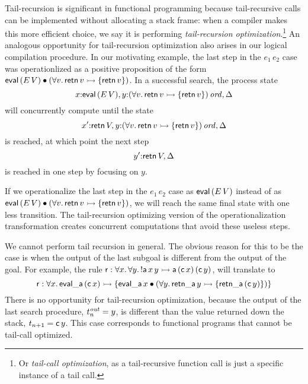 Tail-recursion is significant in functional programming because
tail-recursive calls can be implemented without allocating a stack
frame: when a compiler makes this more efficient choice, we say it is
performing {\it tail-recursion optimization}.\footnote{Or {\it tail-call optimization}, as a tail-recursive function call is just a
  specific instance of a tail call.} An analogous opportunity for
tail-recursion optimization also arises in our logical compilation
procedure. In our motivating example, the last step in the $e_1\,e_2$
case was operationlized as a positive proposition of the form ${\sf
  eval}\,(E\, V) \mathbin{\bullet} (\forall v.\,{\sf retn}\,v \rightarrowtail \{ {\sf
  retn}\,v \})$. In a successful search, the process state 
\[ x{:}{\sf
  eval}\,(E\, V), y{:}{(\forall v.\,{\sf retn}\,v \rightarrowtail \{
  {\sf retn}\,v \})}\,{{\it ord}}, \Delta\]
will concurrently compute until the
state 
\[ x'{:}{\sf retn}\,V, y{:}{(\forall v.\,{\sf retn}\,v \rightarrowtail
  \{ {\sf retn}\,v \})}\,{{\it ord}}, \Delta\] is reached, at which point the next
step \[y'{:}{\sf retn}\,V, \Delta\] is reached in one step by focusing
on $y$. 

If we operationalize the last step in the $e_1\,e_2$ case as ${\sf
  eval}\,(E\,V)$ instead of as ${\sf eval}\,(E\, V) \mathbin{\bullet} (\forall
v.\,{\sf retn}\,v \rightarrowtail \{ {\sf retn}\,v \})$, we will reach the same
final state with one less transition. The tail-recursion optimizing
version of the operationalization transformation creates concurrent
computations that avoid these useless steps.

We cannot perform tail recursion in general. The obvious reason for
this to be the case is when the output of the last subgoal is
different from the output of the goal. For example, the rule ${\sf r}
: \forall{x}.\,\forall{y}.\,{!}{\sf a}\,x\,y \rightarrowtail {\sf a}\,({\sf
  c}\,x)\,({\sf c}\,y)$, will translate to
\[ {\sf r} : \forall{x}.\,{\sf eval\_a}\,({\sf c}\,x) \rightarrowtail \{ {\sf
  eval\_a}\,x \mathbin{\bullet} (\forall y.\, {\sf retn\_a}\,y \rightarrowtail \{ {\sf
  retn\_a}\,({\sf c}\,y) \} ) \} \] There is no opportunity for
tail-recursion optimization, because the output of the last search
procedure, $t^{\it out}_n = y$, is different than the value returned
down the stack, $t_{n+1} = {\sf c}\,y$. This case corresponds to
functional programs that cannot be tail-call optimized.

